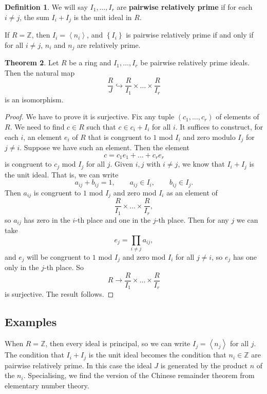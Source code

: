 \documentclass{article}
\newcommand{\Z}{\mathbb{Z}}
\newcommand{\rb}[1]{\left( #1 \right)}
\newcommand{\cb}[1]{\left\{ #1 \right\}}
\newcommand{\ab}[1]{\left\langle #1 \right\rangle}
\theoremstyle{definition}\newtheorem{definition}{Definition}[subsection]
\theoremstyle{definition}\newtheorem{remark}[definition]{Remark}
\theoremstyle{definition}\newtheorem*{example}{Example}
\theoremstyle{definition}\newtheorem*{note}{Note}
\newtheorem{theorem}[definition]{Theorem}
\begin{document}
\begin{definition}
We will say $ I_1, \dots, I_r $ are \textbf{pairwise relatively prime} if for each $ i \ne j $, the sum $ I_i + I_j $ is the unit ideal in $ R $.
\end{definition}

If $ R = \Z $, then $ I_i = \ab{n_i} $, and $ \cb{I_i} $ is pairwise relatively prime if and only if for all $ i \ne j $, $ n_i $ and $ n_j $ are relatively prime.

\begin{theorem}
Let $ R $ be a ring and $ I_1, \dots, I_r $ be pairwise relatively prime ideals. Then the natural map
$$ \dfrac{R}{J} \hookrightarrow \dfrac{R}{I_1} \times \dots \times \dfrac{R}{I_r} $$
is an isomorphism.
\end{theorem}

\begin{proof}
We have to prove it is surjective. Fix any tuple $ \rb{c_1, \dots, c_r} $ of elements of $ R $. We need to find $ c \in R $ such that $ c \in c_i + I_i $ for all $ i $. It suffices to construct, for each $ i $, an element $ e_i $ of $ R $ that is congruent to $ 1 $ mod $ I_i $ and zero modulo $ I_j $ for $ j \ne i $. Suppose we have such an element. Then the element
$$ c = c_1e_1 + \dots + c_re_r $$
is congruent to $ c_j $ mod $ I_j $ for all $ j $. Given $ i, j $ with $ i \ne j $, we know that $ I_i + I_j $ is the unit ideal. That is, we can write
$$ a_{ij} + b_{ij} = 1, \qquad a_{ij} \in I_i, \qquad b_{ij} \in I_j. $$
Then $ a_{ij} $ is congruent to $ 1 $ mod $ I_j $ and zero mod $ I_i $ as an element of
$$ \dfrac{R}{I_1} \times \dots \times \dfrac{R}{I_r}, $$
so $ a_{ij} $ has zero in the $ i $-th place and one in the $ j $-th place. Then for any $ j $ we can take
$$ e_j = \prod_{i \ne j} a_{ij}, $$
and $ e_j $ will be congruent to $ 1 $ mod $ I_j $ and zero mod $ I_i $ for all $ j \ne i $, so $ e_j $ has one only in the $ j $-th place. So
$$ R \to \dfrac{R}{I_1} \times \dots \times \dfrac{R}{I_r} $$
is surjective. The result follows.
\end{proof}

\subsection{Examples}

When $ R = \Z $, then every ideal is principal, so we can write $ I_j = \ab{n_j} $ for all $ j $. The condition that $ I_i + I_j $ is the unit ideal becomes the condition that $ n_i \in \Z $ are pairwise relatively prime. In this case the ideal $ J $ is generated by the product $ n $ of the $ n_i $. Specialising, we find the version of the Chinese remainder theorem from elementary number theory.
\end{document}
